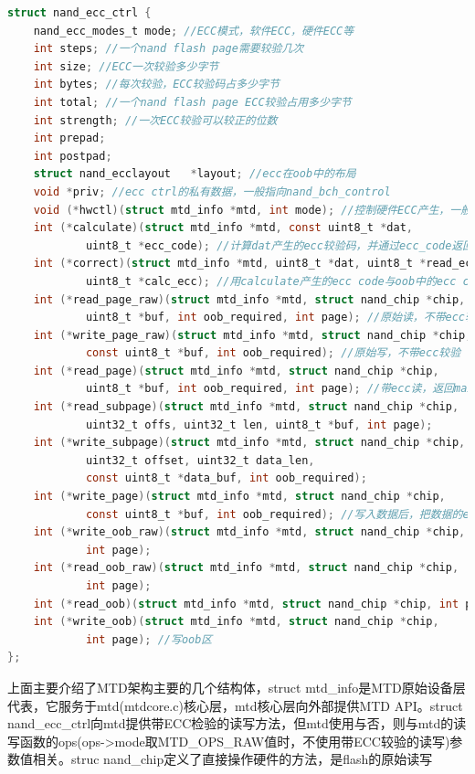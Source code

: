 \begin{lstlisting}[language=C]
struct nand_ecc_ctrl {
	nand_ecc_modes_t mode; //ECC模式，软件ECC，硬件ECC等
	int steps; //一个nand flash page需要较验几次
	int size; //ECC一次较验多少字节
	int bytes; //每次较验，ECC较验码占多少字节
	int total; //一个nand flash page ECC较验占用多少字节 
	int strength; //一次ECC较验可以较正的位数
	int prepad;
	int postpad;
	struct nand_ecclayout	*layout; //ecc在oob中的布局
	void *priv; //ecc ctrl的私有数据，一般指向nand_bch_control
	void (*hwctl)(struct mtd_info *mtd, int mode); //控制硬件ECC产生，一般是enable硬件ecc模块
	int (*calculate)(struct mtd_info *mtd, const uint8_t *dat,
			uint8_t *ecc_code); //计算dat产生的ecc较验码，并通过ecc_code返回
	int (*correct)(struct mtd_info *mtd, uint8_t *dat, uint8_t *read_ecc,
			uint8_t *calc_ecc); //用calculate产生的ecc code与oob中的ecc code进行数据较验
	int (*read_page_raw)(struct mtd_info *mtd, struct nand_chip *chip,
			uint8_t *buf, int oob_required, int page); //原始读，不带ecc较验
	int (*write_page_raw)(struct mtd_info *mtd, struct nand_chip *chip,
			const uint8_t *buf, int oob_required); //原始写，不带ecc较验
	int (*read_page)(struct mtd_info *mtd, struct nand_chip *chip,
			uint8_t *buf, int oob_required, int page); //带ecc读，返回max-bitflip
	int (*read_subpage)(struct mtd_info *mtd, struct nand_chip *chip,
			uint32_t offs, uint32_t len, uint8_t *buf, int page);
	int (*write_subpage)(struct mtd_info *mtd, struct nand_chip *chip,
			uint32_t offset, uint32_t data_len,
			const uint8_t *data_buf, int oob_required);
	int (*write_page)(struct mtd_info *mtd, struct nand_chip *chip,
			const uint8_t *buf, int oob_required); //写入数据后，把数据的ecc较验码也写进去
	int (*write_oob_raw)(struct mtd_info *mtd, struct nand_chip *chip,
			int page);
	int (*read_oob_raw)(struct mtd_info *mtd, struct nand_chip *chip,
			int page);
	int (*read_oob)(struct mtd_info *mtd, struct nand_chip *chip, int page); //读oob区
	int (*write_oob)(struct mtd_info *mtd, struct nand_chip *chip,
			int page); //写oob区
};

\end{lstlisting}

上面主要介绍了MTD架构主要的几个结构体，struct mtd\_info是MTD原始设备层代表，它服务于mtd(mtdcore.c)核心层，mtd核心层向外部提供MTD API。struct nand\_ecc\_ctrl向mtd提供带ECC检验的读写方法，但mtd使用与否，则与mtd的读写函数的ops(ops->mode取MTD\_OPS\_RAW值时，不使用带ECC较验的读写)参数值相关。struc nand\_chip定义了直接操作硬件的方法，是flash的原始读写

